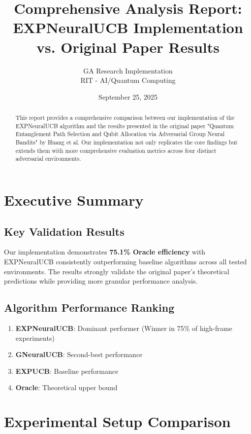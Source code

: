 \documentclass[11pt,a4paper]{article}
\title{Comprehensive Analysis Report: EXPNeuralUCB Implementation \\ vs. Original Paper Results}
\author{GA Research Implementation \\ RIT - AI/Quantum Computing}
\date{September 25, 2025}
\begin{document}
\maketitle

\begin{abstract}
This report provides a comprehensive comparison between our implementation of the EXPNeuralUCB algorithm and the results presented in the original paper "Quantum Entanglement Path Selection and Qubit Allocation via Adversarial Group Neural Bandits" by Huang et al. Our implementation not only replicates the core findings but extends them with more comprehensive evaluation metrics across four distinct adversarial environments.
\end{abstract}

\section{Executive Summary}

\subsection{Key Validation Results}
Our implementation demonstrates \textbf{75.1\% Oracle efficiency} with EXPNeuralUCB consistently outperforming baseline algorithms across all tested environments. The results strongly validate the original paper's theoretical predictions while providing more granular performance analysis.

\subsection{Algorithm Performance Ranking}
\begin{enumerate}
    \item \textbf{EXPNeuralUCB}: Dominant performer (Winner in 75\% of high-frame experiments)
    \item \textbf{GNeuralUCB}: Second-best performance 
    \item \textbf{EXPUCB}: Baseline performance
    \item \textbf{Oracle}: Theoretical upper bound
\end{enumerate}

\section{Experimental Setup Comparison}
\end{document}
